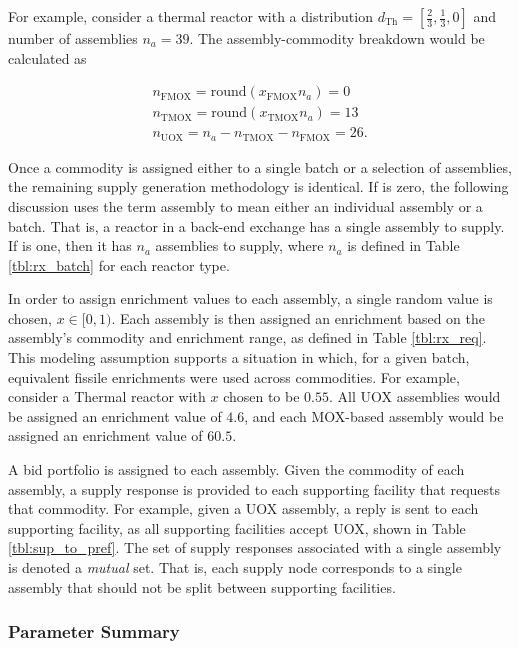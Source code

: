 For example, consider a thermal reactor with a distribution $d_{\text{Th}} =
[\frac{2}{3}, \frac{1}{3}, 0]$ and number of assemblies $n_a = 39$. The
assembly-commodity breakdown would be calculated as

\begin{gather*}
n_{\text{FMOX}} = \text{round}(x_{\text{FMOX}} n_a) = 0 \\
n_{\text{TMOX}} = \text{round}(x_{\text{TMOX}} n_a) = 13 \\
n_{\text{UOX}} = n_a - n_{\text{TMOX}} - n_{\text{FMOX}} = 26.
\end{gather*}

Once a commodity is assigned either to a single batch or a selection of
assemblies, the remaining supply generation methodology is identical. If \frx is
zero, the following discussion uses the term assembly to mean either an
individual assembly or a batch. That is, a reactor in a back-end exchange has a
single assembly to supply. If \frx is one, then it has $n_a$ assemblies to
supply, where $n_a$ is defined in Table \ref{tbl:rx_batch} for each reactor
type.

In order to assign enrichment values to each assembly, a single random value is
chosen, $x \in [0, 1)$. Each assembly is then assigned an enrichment based on
  the assembly's commodity and enrichment range, as defined in Table
  \ref{tbl:rx_req}. This modeling assumption supports a situation in which, for
  a given batch, equivalent fissile enrichments were used across
  commodities. For example, consider a Thermal reactor with $x$ chosen to be
  $0.55$. All UOX assemblies would be assigned an enrichment value of $4.6$, and
  each MOX-based assembly would be assigned an enrichment value of $60.5$.

A bid portfolio is assigned to each assembly. Given the commodity of each
assembly, a supply response is provided to each supporting facility that requests
that commodity. For example, given a UOX assembly, a reply is sent to each
supporting facility, as all supporting facilities accept UOX, shown in Table
\ref{tbl:sup_to_pref}. The set of supply responses associated with a single
assembly is denoted a \textit{mutual} set. That is, each supply node corresponds
to a single assembly that should not be split between supporting facilities.

\subsubsection{Parameter Summary}

